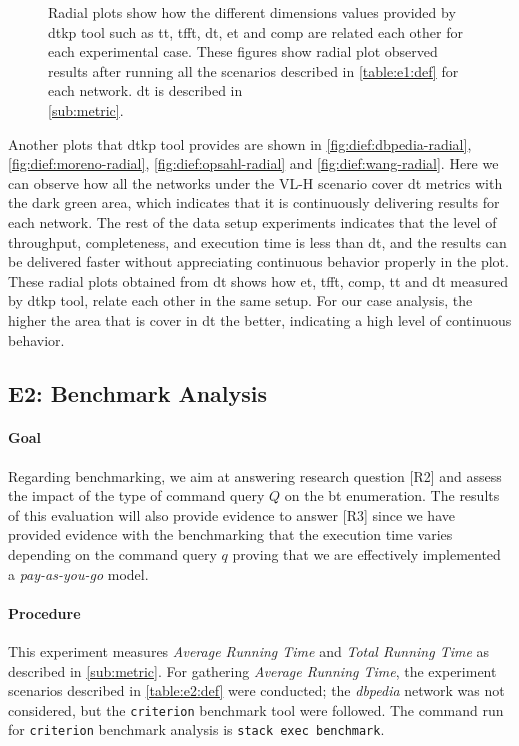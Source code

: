 \begin{figure}[!htp]
\begin{subfigure}[t]{0.45\textwidth}
    \label{fig:dief:wang-radial}
  \end{subfigure}
  \caption[{[EE] \acrshort{dt} General Results (Radial)}]{Radial plots show how the different dimensions values provided by \acrshort{dtkp} tool such as \acrfull{tt}, \acrfull{tfft}, \acrfull{dt}, \acrfull{et} and \acrfull{comp} are related each other for each experimental case. These figures show radial plot observed results after running all the scenarios described in \autoref{table:e1:def} for each network. \acrshort{dt} is described in \\ \autoref{sub:metric}.}
\end{figure}

Another plots that \acrshort{dtkp} tool provides are shown in \autoref{fig:dief:dbpedia-radial}, \autoref{fig:dief:moreno-radial}, \autoref{fig:dief:opsahl-radial} and \autoref{fig:dief:wang-radial}.
Here we can observe how all the networks under the VL-H scenario cover \acrshort{dt} metrics with the dark green area, which indicates that it is continuously delivering results for each network. 
The rest of the data setup experiments indicates that the level of throughput, completeness, and execution time is less than \acrfull{dt}, and the results can be delivered faster without appreciating continuous behavior properly in the plot. 
These radial plots obtained from \acrshort{dt} shows how \acrfull{et}, \acrfull{tfft}, \acrfull{comp}, \acrfull{tt} and \acrshort{dt} measured by \acrshort{dtkp} tool, relate each other in the same setup. 
For our case analysis, the higher the area that is cover in \acrfull{dt} the better, indicating a high level of continuous behavior.

\subsection{E2: Benchmark Analysis}\label{sub:sec:exp-2} 
\paragraph{Goal} Regarding benchmarking, we aim at answering research question [R2] and assess  the impact of the type of command query $Q$ on the  \acrshort{bt} enumeration.
The results of this evaluation will also provide evidence to answer [R3] since we have provided evidence with the benchmarking that the execution time varies depending on the command query $q$ proving that we are effectively implemented a \emph{pay-as-you-go} model. 

\paragraph{Procedure} This experiment measures \emph{Average Running Time} and \emph{Total Running Time} as  described in \autoref{sub:metric}. 
For gathering \emph{Average Running Time}, the experiment scenarios described in \autoref{table:e2:def} were conducted; the \emph{\acrshort{dbpedia}} network was not considered, but the \texttt{criterion} \cite{criterion} benchmark tool were followed.
The command run for \texttt{criterion} benchmark analysis is \texttt{stack exec benchmark}. 

